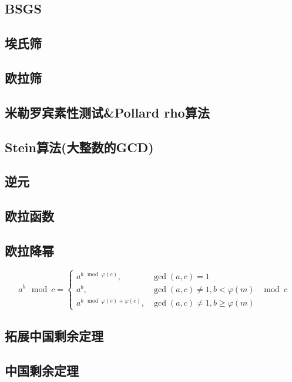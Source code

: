 \documentclass[twocolumn,a4paper]{article}  %
\begin{document}
\subsection{BSGS}

\subsection{埃氏筛}

\subsection{欧拉筛}

\subsection{米勒罗宾素性测试\&Pollard rho算法}

\subsection{Stein算法(大整数的GCD)}

\subsection{逆元}


\subsection{欧拉函数}


\subsection{欧拉降幂}
$$
	a^b\mod c=
	\begin{cases}
		a^{b\mod \varphi(c)}, &\gcd(a,c)=1\\
		a^b, &\gcd(a,c)\ne1,b<\varphi(m)\\
		a^{b\mod \varphi(c)+\varphi(c)}, &\gcd(a,c)\ne1,b\ge\varphi(m)
	\end{cases}\mod c
$$
\subsection{拓展中国剩余定理}

\subsection{中国剩余定理}

\end{document}
